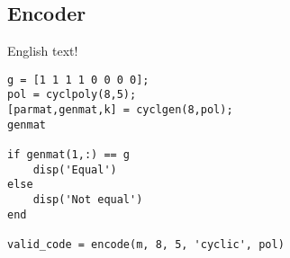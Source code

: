 \documentclass[Main]{subfiles}
\begin{document}
\subsection{Encoder}

English text!

\begin{lstlisting}[caption=Overskrift, style=Code-Matlab, label=lst:refID]
g = [1 1 1 1 0 0 0 0];
pol = cyclpoly(8,5);
[parmat,genmat,k] = cyclgen(8,pol);
genmat

if genmat(1,:) == g
    disp('Equal')
else
    disp('Not equal')
end

valid_code = encode(m, 8, 5, 'cyclic', pol)
\end{lstlisting}
\end{document}
